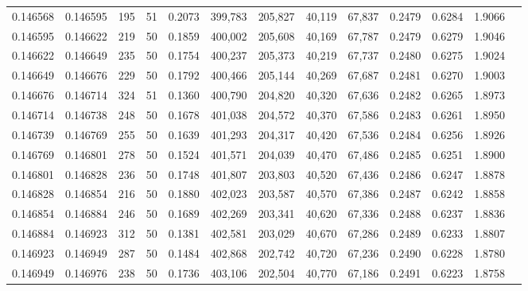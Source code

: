 \begin{tabular}{rrrrrrrrrrrrr}
0.146568 & 0.146595 &   195 &  51 &                                     0.2073 & 399,783 & 205,827 &  40,119 &  67,837 & 0.2479 & 0.6284 & 1.9066 \\
0.146595 & 0.146622 &   219 &  50 &                                     0.1859 & 400,002 & 205,608 &  40,169 &  67,787 & 0.2479 & 0.6279 & 1.9046 \\
0.146622 & 0.146649 &   235 &  50 &                                     0.1754 & 400,237 & 205,373 &  40,219 &  67,737 & 0.2480 & 0.6275 & 1.9024 \\
0.146649 & 0.146676 &   229 &  50 &                                     0.1792 & 400,466 & 205,144 &  40,269 &  67,687 & 0.2481 & 0.6270 & 1.9003 \\
0.146676 & 0.146714 &   324 &  51 &                                     0.1360 & 400,790 & 204,820 &  40,320 &  67,636 & 0.2482 & 0.6265 & 1.8973 \\
0.146714 & 0.146738 &   248 &  50 &                                     0.1678 & 401,038 & 204,572 &  40,370 &  67,586 & 0.2483 & 0.6261 & 1.8950 \\
0.146739 & 0.146769 &   255 &  50 &                                     0.1639 & 401,293 & 204,317 &  40,420 &  67,536 & 0.2484 & 0.6256 & 1.8926 \\
0.146769 & 0.146801 &   278 &  50 &                                     0.1524 & 401,571 & 204,039 &  40,470 &  67,486 & 0.2485 & 0.6251 & 1.8900 \\
0.146801 & 0.146828 &   236 &  50 &                                     0.1748 & 401,807 & 203,803 &  40,520 &  67,436 & 0.2486 & 0.6247 & 1.8878 \\
0.146828 & 0.146854 &   216 &  50 &                                     0.1880 & 402,023 & 203,587 &  40,570 &  67,386 & 0.2487 & 0.6242 & 1.8858 \\
0.146854 & 0.146884 &   246 &  50 &                                     0.1689 & 402,269 & 203,341 &  40,620 &  67,336 & 0.2488 & 0.6237 & 1.8836 \\
0.146884 & 0.146923 &   312 &  50 &                                     0.1381 & 402,581 & 203,029 &  40,670 &  67,286 & 0.2489 & 0.6233 & 1.8807 \\
0.146923 & 0.146949 &   287 &  50 &                                     0.1484 & 402,868 & 202,742 &  40,720 &  67,236 & 0.2490 & 0.6228 & 1.8780 \\
0.146949 & 0.146976 &   238 &  50 &                                     0.1736 & 403,106 & 202,504 &  40,770 &  67,186 & 0.2491 & 0.6223 & 1.8758 \\

\end{tabular}
